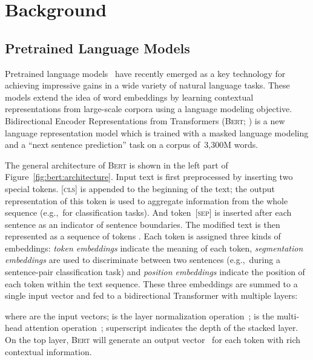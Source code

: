 \documentclass[11pt,a4paper]{article}
\begin{document}
    \section{Background}
    \label{sec:background}
    
    \subsection{Pretrained Language Models}
    \label{sec:pretr-lang-models}
    Pretrained language models~\cite{peters2018deep,radford2018improving,devlin2018bert,dong2019unified,hibert} have recently emerged as a key technology
    for achieving impressive gains in a wide variety of natural language
    tasks.  These models extend the idea of word embeddings
    by learning contextual representations from large-scale corpora using
    a language modeling objective.  Bidirectional Encoder Representations
    from Transformers (\textsc{Bert}; \citealt{devlin2018bert}) is a new
    language representation model which is trained with a masked language
    modeling  and a ``next sentence prediction'' task on a corpus
    of~3,300M words.
    
    The general architecture of \textsc{Bert} is shown in the left part
    of Figure~\ref{fig:bert:architecture}. Input text is first
    preprocessed by inserting two special tokens.  [\textsc{cls}] is
    appended to the beginning of the text; the output representation of
    this token is used to aggregate information from the whole sequence
    (e.g.,~for classification tasks).  And token~[\textsc{sep}] is
    inserted after each sentence as an indicator of sentence boundaries.
    The modified text is then represented as a sequence of tokens
    . Each token  is assigned three kinds of
    embeddings: \emph{token embeddings} indicate the meaning of each
    token, \emph{segmentation embeddings} are used to discriminate between
    two sentences (e.g.,~during a sentence-pair classification task) and
    \emph{position embeddings} indicate the position of each token within
    the text sequence.  These three embeddings are summed to a single
    input vector  and fed to a bidirectional Transformer with
    multiple layers:
            \vspace{-0.5ex}
        
    where  are the input vectors;  is the layer
    normalization operation~\cite{ba2016layer};  is
    the multi-head attention operation~\cite{vaswani2017attention};
    superscript  indicates the depth of the stacked layer. On the
    top layer, \textsc{Bert} will generate an output vector~ for
    each token with rich contextual information.
    
\end{document}

